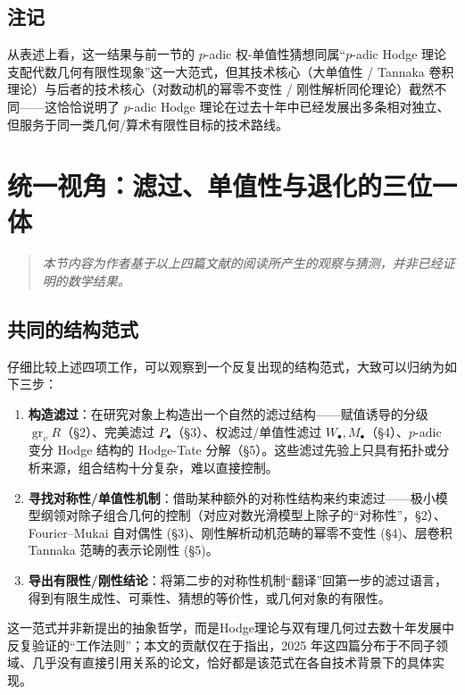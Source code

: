 \documentclass[11pt,a4paper]{article}
\theoremstyle{definition}
\theoremstyle{remark}
\DeclareMathOperator{\gr}{gr}
\begin{document}
\subsection{注记}

从表述上看，这一结果与前一节的 $p$-adic 权-单值性猜想同属“$p$-adic Hodge 理论支配代数几何有限性现象”这一大范式，但其技术核心（大单值性 / Tannaka 卷积理论）与后者的技术核心（对数动机的幂零不变性 / 刚性解析同伦理论）截然不同——这恰恰说明了 $p$-adic Hodge 理论在过去十年中已经发展出多条相对独立、但服务于同一类几何/算术有限性目标的技术路线。

\section{统一视角：滤过、单值性与退化的三位一体}

\begin{quote}
\emph{本节内容为作者基于以上四篇文献的阅读所产生的观察与猜测，并非已经证明的数学结果。}
\end{quote}

\subsection{共同的结构范式}

仔细比较上述四项工作，可以观察到一个反复出现的结构范式，大致可以归纳为如下三步：

\begin{enumerate}[leftmargin=1.6em]
  \item \textbf{构造滤过}：在研究对象上构造出一个自然的滤过结构——赋值诱导的分级 $\gr_v R$（\S 2）、完美滤过 $P_\bullet$（\S 3）、权滤过/单值性滤过 $W_\bullet, M_\bullet$（\S 4）、$p$-adic 变分 Hodge 结构的 Hodge-Tate 分解（\S 5）。这些滤过先验上只具有拓扑或分析来源，组合结构十分复杂，难以直接控制。

  \item \textbf{寻找对称性/单值性机制}：借助某种额外的对称性结构来约束滤过——极小模型纲领对除子组合几何的控制（对应对数光滑模型上除子的“对称性”，\S 2）、Fourier--Mukai 自对偶性 (\S 3)、刚性解析动机范畴的幂零不变性 (\S 4)、层卷积 Tannaka 范畴的表示论刚性 (\S 5)。

  \item \textbf{导出有限性/刚性结论}：将第二步的对称性机制“翻译”回第一步的滤过语言，得到有限生成性、可乘性、猜想的等价性，或几何对象的有限性。
\end{enumerate}

这一范式并非新提出的抽象哲学，而是Hodge理论与双有理几何过去数十年发展中反复验证的“工作法则”；本文的贡献仅在于指出，2025 年这四篇分布于不同子领域、几乎没有直接引用关系的论文，恰好都是该范式在各自技术背景下的具体实现。
\end{document}
